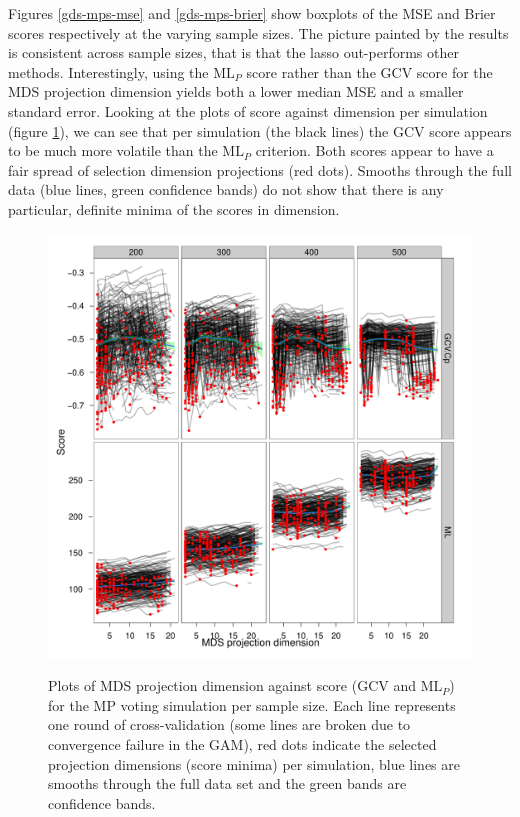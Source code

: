 Figures \ref{gds-mps-mse} and \ref{gds-mps-brier} show boxplots of the MSE and Brier scores respectively at the varying sample sizes. The picture painted by the results is consistent across sample sizes, that is that the lasso out-performs other methods. Interestingly, using the $\text{ML}_P$ score rather than the GCV score for the MDS projection dimension yields both a lower median MSE and a smaller standard error. Looking at the plots of score against dimension per simulation (figure \ref{gds-mps-dimselect}), we can see that per simulation (the black lines) the GCV score appears to be much more volatile than the $\text{ML}_P$ criterion. Both scores appear to have a fair spread of selection dimension projections (red dots). Smooths through the full data (blue lines, green confidence bands) do not show that there is any particular, definite minima of the scores in dimension.

\begin{figure}
\centering
\includegraphics[width=6in]{gds/figs/mps-dimselect.pdf} \\
\caption{Plots of MDS projection dimension against score (GCV and $\text{ML}_P$) for the MP voting simulation per sample size. Each line represents one round of cross-validation (some lines are broken due to convergence failure in the GAM), red dots indicate the selected projection dimensions (score minima) per simulation, blue lines are smooths through the full data set and the green bands are confidence bands.}
\label{gds-mps-dimselect}
\end{figure}

